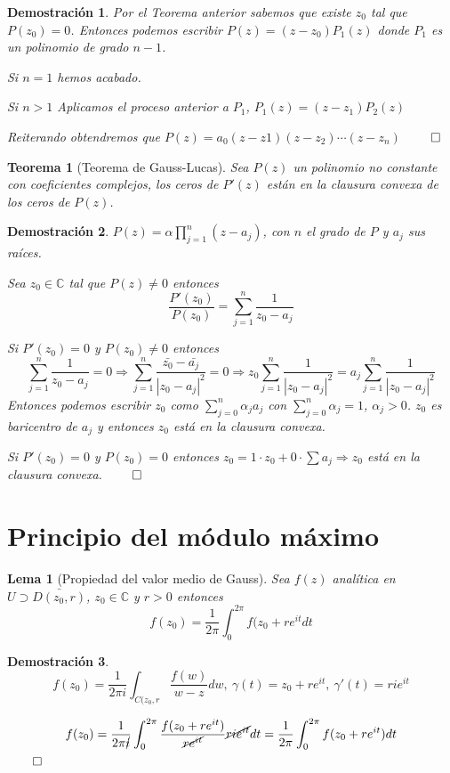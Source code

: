 \documentclass[10pt]{book}
\newtheorem{theorem}{Teorema}[chapter]
\newtheorem*{dem}{Demostración}
\newtheorem{lema}{Lema}[chapter]
\newcommand{\C}{\mathbb{C}}
\begin{document}
\begin{dem}
Por el Teorema anterior sabemos que existe $z_0$ tal que $P(z_0)=0$. Entonces podemos escribir $P(z) = (z-z_0)P_1(z)$ donde $P_1$ es un polinomio de grado $n-1$.

Si $n=1$ hemos acabado.

Si $n>1$ Aplicamos el proceso anterior a $P_1$, $P_1(z) = (z-z_1)P_2(z)$

Reiterando obtendremos que $P(z) = a_0(z-z1)(z-z_2)\cdots(z-z_n)$ 
$\qed$
\end{dem}


\begin{theorem}[Teorema de Gauss-Lucas]
Sea $P(z)$ un polinomio no constante con coeficientes complejos, los ceros de $P'(z)$ están en la clausura convexa de los ceros de $P(z)$.
\end{theorem}

\begin{dem}
$P(z)= \alpha \prod_{j=1}^n(z-a_j)$, con $n$ el grado de $P$ y $a_j$ sus raíces.

Sea $z_0\in\C$ tal que $P(z) \neq 0$ entonces 
$$\frac{P'(z_0)}{P(z_0)} = \sum_{j=1}^n \frac{1}{z_0-a_j}$$

Si $P'(z_0) = 0$  y $P(z_0)\neq 0$ entonces 
$$ \sum_{j=1}^n \frac{1}{z_0-a_j}=0 \Rightarrow \sum_{j=1}^n \frac{\bar{z_0}-\bar{a_j}}{|z_0-a_j|^2}=0 \Rightarrow z_0\sum_{j=1}^n \frac{1}{|z_0-a_j|^2} = a_j \sum_{j=1}^n \frac{1}{|z_0-a_j|^2}
$$
Entonces podemos escribir $z_0$ como $\sum_{j=0}^n \alpha_j a_j$ con $\sum_{j=0}^n \alpha_j = 1$, $\alpha_j >0$. $z_0$ es baricentro de $a_j$ y entonces $z_0$ está en la clausura convexa.

Si $P'(z_0) = 0$  y $P(z_0)= 0$ entonces $z_0 = 1\cdot z_0 + 0\cdot\sum a_j \Rightarrow z_0$ está en la clausura convexa. $\qed$
\end{dem}

\section{Principio del módulo máximo}

\begin{lema}[Propiedad del valor medio de Gauss]
Sea $f(z)$ analítica en $U\supset \bar{D(z_0,r)}$, $z_0\in\C$ y $r>0$ entonces
$$f(z_0) = \frac{1}{2\pi} \int_0^{2\pi} f(z_0+re^{it}dt$$
\end{lema}

\begin{dem}
$$f(z_0) = \frac{1}{2\pi i} \int_{C(z_0,r} \frac{f(w)}{w-z}dw,\ \gamma(t) = z_0+re^{it},\ \gamma'(t) = rie^{it}$$

$$
f(z_0) = \frac{1}{2\pi\cancel{i}}\int_0^{2\pi} \frac{f(z_0+re^{it})}{\cancel{r{e^{it}}}}\cancel{ri{e^{it}}}dt = \frac{1}{2\pi} \int_0^{2\pi} f(z_0+re^{it})dt
$$$\qed$
\end{dem}
\end{document}

